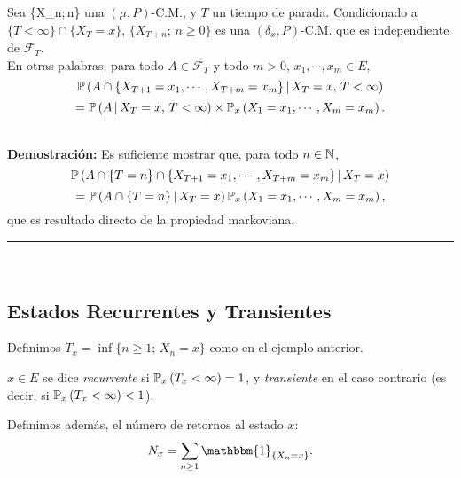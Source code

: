\begin{teorema}
Sea \{X_n;\,n\} una $(\mu,P)$-C.M., y $T$ un tiempo de parada. Condicionado a $\{T<\infty\}\cap\{X_T = x\}$, $\{X_{T+n};\,n\geq 0\}$ es una $(\delta_x,P)$-C.M. que es independiente de $\mathcal{F}_T$.\\ \newline
En otras palabras; para todo $A\in \mathcal{F}_T$ y todo $m>0$, $x_1,\cdots,x_m \in E$,
\[\mathbb{P}\left(A\cap\{X_{T+1}=x_1,\cdots,X_{T+m}=x_m\}\,|\,X_T=x,\,T<\infty\right)\]
\[= \mathbb{P}\left(A\,|\,X_T = x,\,T<\infty\right)\times\mathbb{P}_x\left(X_1 = x_1,\cdots,X_m = x_m\right).\]
\end{teorema}\\ \newline
\textbf{Demostración: }Es suficiente mostrar que, para todo $n\in \mathbb N$,
\[\mathbb{P}\left(A\cap\{T=n\}\cap\{X_{T+1}=x_1,\cdots,X_{T+m}=x_m\}\,|\,X_T=x\right)\]
\[= \mathbb{P}\left(A\cap\{T=n\}\,|\,X_T = x\right)\mathbb{P}_x\left(X_1 = x_1,\cdots,X_m=x_m\right),\]
que es resultado directo de la propiedad markoviana.\\ \newline
\rule{0.7em}{0.7em}\\ \newline

\subsection{Estados Recurrentes y Transientes }
Definimos $T_x = \inf\{n\geq 1;\,X_n = x\}$ como en  el ejemplo anterior.\\ \newline

\begin{definicion}
$x\in E$ se dice \textit{recurrente} si $\mathbb{P}_x\left(T_x <\infty\right)=1$, y \textit{transiente} en el caso contrario (es decir, si $\mathbb{P}_x\left(T_x<\infty\right)<1$).
\end{definicion}
 Definimos además, el número de retornos al estado $x$:
 \[N_x = \sum_{n\geq 1}\mathbbm{1}_{\{X_n = x\}}.\]
 
